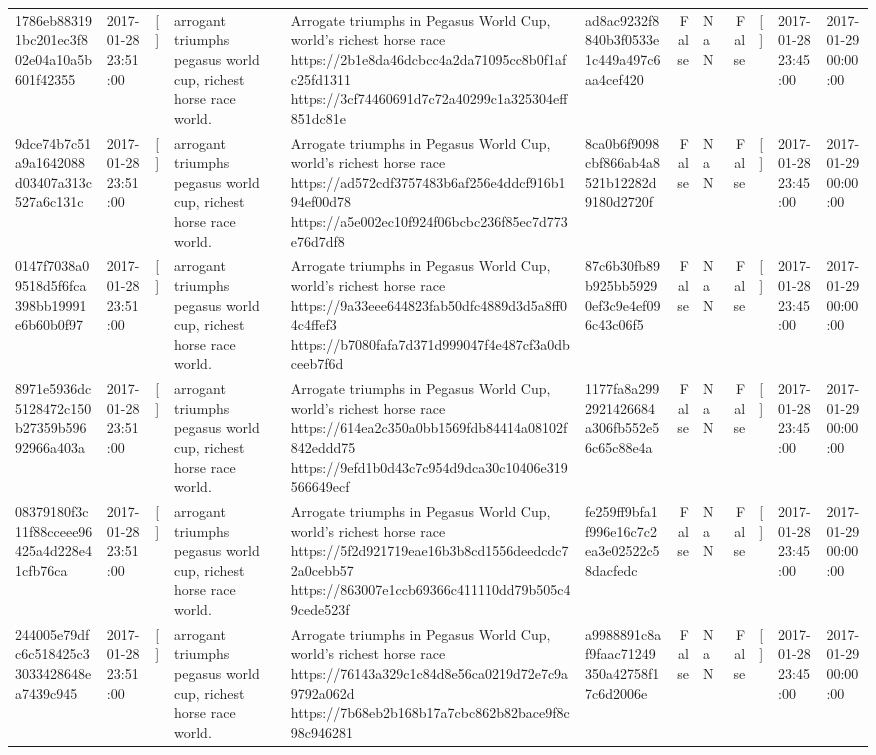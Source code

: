 \begin{tabular}{llllllrlrlll}
1786eb883191bc201ec3f802e04a10a5b601f42355 & 2017-01-28 23:51:00 & [] & arrogant triumphs pegasus world cup, richest horse race world. & Arrogate triumphs in Pegasus World Cup, world's richest horse race https://2b1e8da46dcbcc4a2da71095cc8b0f1afc25fd1311 https://3cf74460691d7c72a40299c1a325304eff851dc81e & ad8ac9232f8840b3f0533e1c449a497c6aa4cef420 & False & NaN & False & [] & 2017-01-28 23:45:00 & 2017-01-29 00:00:00 \\
9dce74b7c51a9a1642088d03407a313c527a6c131c & 2017-01-28 23:51:00 & [] & arrogant triumphs pegasus world cup, richest horse race world. & Arrogate triumphs in Pegasus World Cup, world's richest horse race https://ad572cdf3757483b6af256e4ddcf916b194ef00d78 https://a5e002ec10f924f06bcbc236f85ec7d773e76d7df8 & 8ca0b6f9098cbf866ab4a8521b12282d9180d2720f & False & NaN & False & [] & 2017-01-28 23:45:00 & 2017-01-29 00:00:00 \\
0147f7038a09518d5f6fca398bb19991e6b60b0f97 & 2017-01-28 23:51:00 & [] & arrogant triumphs pegasus world cup, richest horse race world. & Arrogate triumphs in Pegasus World Cup, world's richest horse race https://9a33eee644823fab50dfc4889d3d5a8ff04c4ffef3 https://b7080fafa7d371d999047f4e487cf3a0dbceeb7f6d & 87c6b30fb89b925bb59290ef3c9e4ef096c43c06f5 & False & NaN & False & [] & 2017-01-28 23:45:00 & 2017-01-29 00:00:00 \\
8971e5936dc5128472c150b27359b59692966a403a & 2017-01-28 23:51:00 & [] & arrogant triumphs pegasus world cup, richest horse race world. & Arrogate triumphs in Pegasus World Cup, world's richest horse race https://614ea2c350a0bb1569fdb84414a08102f842eddd75 https://9efd1b0d43c7c954d9dca30c10406e319566649ecf & 1177fa8a2992921426684a306fb552e56c65c88e4a & False & NaN & False & [] & 2017-01-28 23:45:00 & 2017-01-29 00:00:00 \\
08379180f3c11f88cceee96425a4d228e41cfb76ca & 2017-01-28 23:51:00 & [] & arrogant triumphs pegasus world cup, richest horse race world. & Arrogate triumphs in Pegasus World Cup, world's richest horse race https://5f2d921719eae16b3b8cd1556deedcdc72a0cebb57 https://863007e1ccb69366c411110dd79b505c49cede523f & fe259ff9bfa1f996e16c7c2ea3e02522c58dacfedc & False & NaN & False & [] & 2017-01-28 23:45:00 & 2017-01-29 00:00:00 \\
244005e79dfc6c518425c33033428648ea7439c945 & 2017-01-28 23:51:00 & [] & arrogant triumphs pegasus world cup, richest horse race world. & Arrogate triumphs in Pegasus World Cup, world's richest horse race https://76143a329c1c84d8e56ca0219d72e7c9a9792a062d https://7b68eb2b168b17a7cbc862b82bace9f8c98c946281 & a9988891c8af9faac71249350a42758f17c6d2006e & False & NaN & False & [] & 2017-01-28 23:45:00 & 2017-01-29 00:00:00 \\

\end{tabular}
